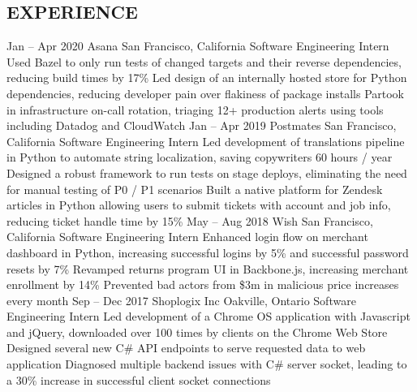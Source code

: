 \documentclass{aanguyen_res}
\begin{document}
  \begin{main}
    \vspace{0.2cm}%
    \section{EXPERIENCE}
      \begin{entrylist}
        \rightentry%
          {Jan -- Apr 2020}%
          {Asana}%
          {San Francisco, California}%
          {Software Engineering Intern}%
          {\createlist%
            {%
              Used Bazel to only run tests of changed targets and their reverse dependencies, %
              reducing build times by 17\% %
            }%
            {%
              Led design of an internally hosted store for Python dependencies, reducing developer %
              pain over flakiness of package installs %
            }%
            {%
              Partook in infrastructure on-call rotation, triaging 12+ production alerts using tools %
              including Datadog and CloudWatch %
            }%
          }
        \rightentry%
          {Jan -- Apr 2019}%
          {Postmates}%
          {San Francisco, California}%
          {Software Engineering Intern}%
          {\createlist%
            {%
              Led development of translations pipeline in Python to automate string localization, %
              saving copywriters 60 hours / year %
            }%
            {%
              Designed a robust framework to run tests on stage deploys, eliminating the need for %
              manual testing of P0 / P1 scenarios %
            }%
            {%
              Built a native platform for Zendesk articles in Python allowing users to submit tickets %
              with account and job info, reducing ticket handle time by 15\% %
            }%
          }
        \rightentry%
          {May -- Aug 2018}%
          {Wish}%
          {San Francisco, California}%
          {Software Engineering Intern}%
          {\createlist%
            {%
              Enhanced login flow on merchant dashboard in Python, increasing successful logins %
              by 5\% and successful password resets by 7\% %
            }%
            {%
              Revamped returns program UI in Backbone.js, increasing merchant enrollment %
              by 14\% %
            }%
            {%
              Prevented bad actors from \$3m in malicious price increases every month %
            }%
          }
        \rightentry%
          {Sep -- Dec 2017}%
          {Shoplogix Inc}%
          {Oakville, Ontario}%
          {Software Engineering Intern}%
          {\createlist%
            {%
              Led development of a Chrome OS application with Javascript and jQuery, downloaded %
              over 100 times by clients on the Chrome Web Store %
            }%
            {%
              Designed several new C\# API endpoints to serve requested data to web application %
            }%
            {%
              Diagnosed multiple backend issues with C\# server socket, leading to a 30\% increase %
              in successful client socket connections %
            }%
          }
      \end{entrylist}

\end{main}
\end{document}
